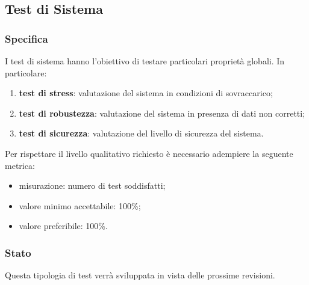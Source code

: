 \subsection{Test di Sistema}

	\subsubsection{Specifica}
		I test di sistema hanno l'obiettivo di testare particolari proprietà globali. In particolare:
		\begin{enumerate}
			\item{\textbf{test di stress}: valutazione del sistema in condizioni di sovraccarico;}
			\item{\textbf{test di robustezza}: valutazione del sistema in presenza di dati non corretti;}
			\item{\textbf{test di sicurezza}: valutazione del livello di sicurezza del sistema.}
		\end{enumerate}
		Per rispettare il livello qualitativo richiesto è necessario adempiere la seguente metrica:
		\begin{itemize}
			\item{misurazione: numero di test soddisfatti;}
			\item{valore minimo accettabile: 100\%;}
			\item{valore preferibile: 100\%.}
		\end{itemize}
	
	
	\subsubsection{Stato}
		Questa tipologia di test verrà sviluppata in vista delle prossime revisioni.